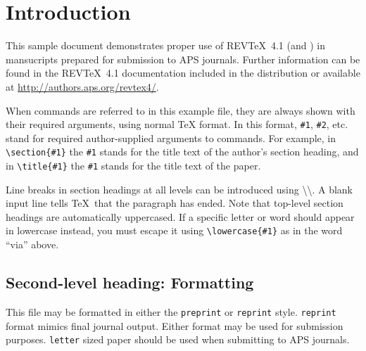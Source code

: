 \documentclass[%
    reprint,
    amsmath,amssymb,
    aps,
   ]{revtex4-1}
\begin{document}
   \maketitle
   
   
   \section{\label{sec:level1}Introduction}
   
   This sample document demonstrates proper use of REV\TeX~4.1 (and
   \LaTeXe) in mansucripts prepared for submission to APS
   journals. Further information can be found in the REV\TeX~4.1
   documentation included in the distribution or available at
   \url{http://authors.aps.org/revtex4/}.
   
   When commands are referred to in this example file, they are always
   shown with their required arguments, using normal \TeX{} format. In
   this format, \verb+#1+, \verb+#2+, etc. stand for required
   author-supplied arguments to commands. For example, in
   \verb+\section{#1}+ the \verb+#1+ stands for the title text of the
   author's section heading, and in \verb+\title{#1}+ the \verb+#1+
   stands for the title text of the paper.
   
   Line breaks in section headings at all levels can be introduced using
   \textbackslash\textbackslash. A blank input line tells \TeX\ that the
   paragraph has ended. Note that top-level section headings are
   automatically uppercased. If a specific letter or word should appear in
   lowercase instead, you must escape it using \verb+\lowercase{#1}+ as
   in the word ``via'' above.
   
   \subsection{\label{sec:level2}Second-level heading: Formatting}
   
   This file may be formatted in either the \texttt{preprint} or
   \texttt{reprint} style. \texttt{reprint} format mimics final journal output. 
   Either format may be used for submission purposes. \texttt{letter} sized paper should
   be used when submitting to APS journals.
   
\end{document}
